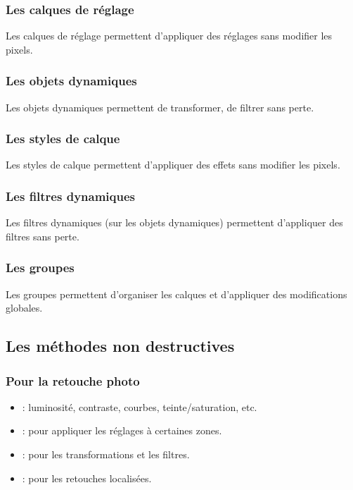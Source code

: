 \subsubsection{Les calques de réglage}

Les calques de réglage permettent d'appliquer des réglages sans modifier les pixels.

\subsubsection{Les objets dynamiques}

Les objets dynamiques permettent de transformer, de filtrer sans perte.

\subsubsection{Les styles de calque}

Les styles de calque permettent d'appliquer des effets sans modifier les pixels.

\subsubsection{Les filtres dynamiques}

Les filtres dynamiques (sur les objets dynamiques) permettent d'appliquer des filtres sans perte.

\subsubsection{Les groupes}

Les groupes permettent d'organiser les calques et d'appliquer des modifications globales.

\subsection{Les méthodes non destructives}

\subsubsection{Pour la retouche photo}

\begin{itemize}
    \item {} : luminosité, contraste, courbes, teinte/saturation, etc.
    \item {} : pour appliquer les réglages à certaines zones.
    \item {} : pour les transformations et les filtres.
    \item {} : pour les retouches localisées.
\end{itemize}

